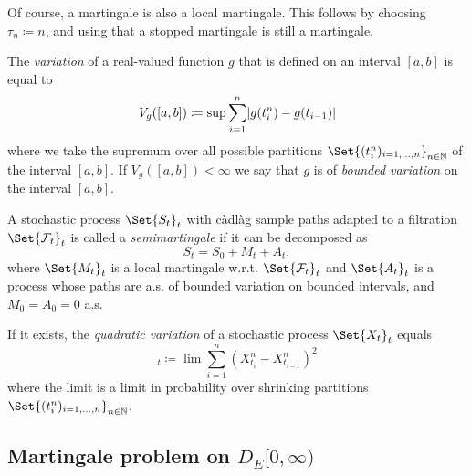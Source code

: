 Of course, a martingale is also a local martingale.
This follows by choosing \( \tau_n \coloneqq n \), and using that a stopped martingale is still a martingale.

\begin{definition}
  The \textit{variation} of a real-valued function \( g \) that is defined on an interval \( [a,b] \) is equal to
  \begin{equation}
    V_g([a,b]) \coloneqq \sup \sum_{i=1}^n \lvert g(t_i^n) - g(t_{i-1}) \rvert
  \end{equation}
  where we take the supremum over all possible partitions \(\Set{(t_i^n)_{i=1,\dots,n}}_{n\in\bN}\) of the interval \( [a,b] \).
  If \( V_g([a,b]) < \infty \) we say that \( g \) is of \textit{bounded variation} on the interval \( [a,b] \).
\end{definition}

\begin{definition}
  A stochastic process \(\Set{S_t}_{t}\) with càdlàg sample paths adapted to a filtration \(\Set{\cF_t}_t\) is called a \textit{semimartingale} if it can be decomposed as
  \begin{equation}
    S_t = S_0 + M_t + A_t,
  \end{equation}
  where \( \Set{M_t}_{t} \) is a local martingale w.r.t. \(\Set{\cF_t}_t\) and \( \Set{A_t}_{t} \) is a process whose paths are a.s. of bounded variation on bounded intervals, and \( M_0 = A_0 = 0 \) a.s.
\end{definition}

\begin{definition}
  If it exists, the \textit{quadratic variation} of a stochastic process \(\Set{X_t}_{t}\) equals
  \begin{equation}
    [X]_t \coloneqq \lim \sum_{i=1}^n (X_{t_i}^n - X_{t_{i-1}}^n)^2
  \end{equation}
  where the limit is a limit in probability over shrinking partitions \(\Set{(t_i^n)_{i=1,\dots,n}}_{n\in\bN}\).
\end{definition}



\subsection{Martingale problem on \texorpdfstring{\(D_E[0,\infty)\)}{D([0,infinity), E)}}\label{sec:martingale-problem}

